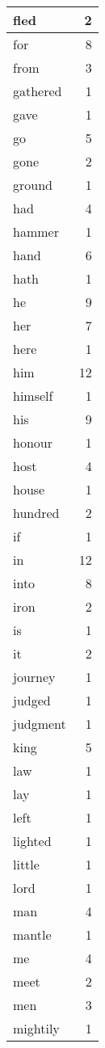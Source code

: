 \begin{center}
\begin{longtable}{l|r}
fled & 2\\ \hline 
for & 8\\ \hline 
from & 3\\ \hline 
gathered & 1\\ \hline 
gave & 1\\ \hline 
go & 5\\ \hline 
gone & 2\\ \hline 
ground & 1\\ \hline 
had & 4\\ \hline 
hammer & 1\\ \hline 
hand & 6\\ \hline 
hath & 1\\ \hline 
he & 9\\ \hline 
her & 7\\ \hline 
here & 1\\ \hline 
him & 12\\ \hline 
himself & 1\\ \hline 
his & 9\\ \hline 
honour & 1\\ \hline 
host & 4\\ \hline 
house & 1\\ \hline 
hundred & 2\\ \hline 
if & 1\\ \hline 
in & 12\\ \hline 
into & 8\\ \hline 
iron & 2\\ \hline 
is & 1\\ \hline 
it & 2\\ \hline 
journey & 1\\ \hline 
judged & 1\\ \hline 
judgment & 1\\ \hline 
king & 5\\ \hline 
law & 1\\ \hline 
lay & 1\\ \hline 
left & 1\\ \hline 
lighted & 1\\ \hline 
little & 1\\ \hline 
lord & 1\\ \hline 
man & 4\\ \hline 
mantle & 1\\ \hline 
me & 4\\ \hline 
meet & 2\\ \hline 
men & 3\\ \hline 
mightily & 1\\ \hline 

\end{longtable}
\end{center}
